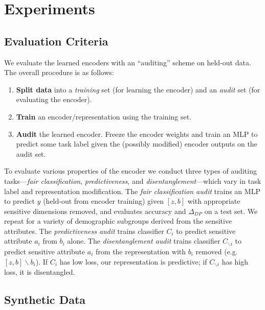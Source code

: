 \section{Experiments}
\subsection{Evaluation Criteria}

We evaluate the learned encoders with an ``auditing'' scheme on held-out data. 
The overall procedure is as follows:
\begin{enumerate}
    \item \textbf{Split data} into a \textit{training} set (for learning the encoder) and an \textit{audit} set (for evaluating the encoder).
    \item \textbf{Train} an encoder/representation using the training set.
    \item \textbf{Audit} the learned encoder. Freeze the encoder weights and train an MLP to predict some task label given the (possibly modified) encoder outputs on the audit set.
\end{enumerate}

To evaluate various properties of the encoder we conduct three types of auditing tasks---\emph{fair classification}, \emph{predictiveness}, and \emph{disentanglement}---which vary in task label and representation modification.
The \emph{fair classification audit} \citep{madras2018learning} trains an MLP to predict $y$ (held-out from encoder training) given $[z,b]$ with appropriate sensitive dimensions removed, and evaluates accuracy and $\Delta_{DP}$ on a test set.
We repeat for a variety of demographic subgroups derived from the sensitive attributes.
The \emph{predictiveness audit} trains classifier $C_i$ to predict sensitive attribute $a_i$ from $b_i$ alone.
The \emph{disentanglement audit} trains classifier $C_{\backslash i}$ to predict sensitive attribute $a_i$ from the representation with $b_i$ removed (e.g. $[z, b]\backslash b_i$).
If $C_i$ has low loss, our representation is predictive; if $C_{\backslash i}$ has high loss, it is disentangled.

\subsection{Synthetic Data} \label{sec:synthetic}

